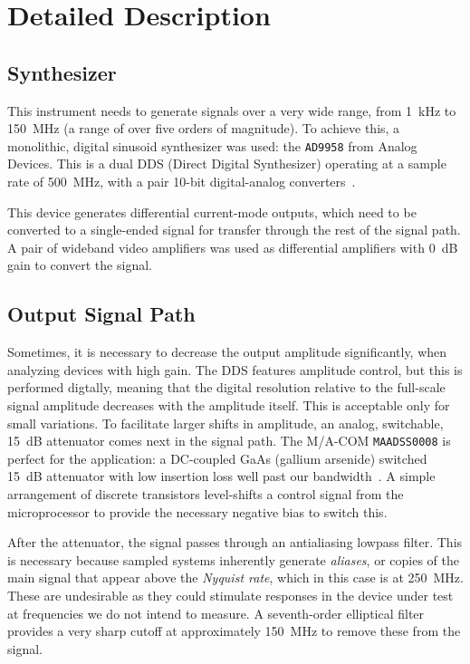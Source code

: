 \section{Detailed Description}

\subsection{Synthesizer}
This instrument needs to generate signals over a very wide range, from 1~kHz to
150~MHz (a range of over five orders of magnitude). To achieve this, a monolithic,
digital sinusoid synthesizer was used: the \texttt{AD9958} from Analog Devices.
This is a dual DDS (Direct Digital Synthesizer) operating at a sample rate of
500~MHz, with a pair 10-bit digital-analog converters~\cite{ad9958}.

This device generates differential current-mode outputs, which need to be
converted to a single-ended signal for transfer through the rest of the signal
path. A pair of wideband video amplifiers was used as differential amplifiers
with 0~dB gain to convert the signal.

\subsection{Output Signal Path}
Sometimes, it is necessary to decrease the output amplitude significantly, when
analyzing devices with high gain. The DDS features amplitude control, but this
is performed digtally, meaning that the digital resolution relative to the full-scale
signal amplitude decreases with the amplitude itself. This is acceptable only for
small variations. To facilitate larger shifts in amplitude, an analog, switchable,
15~dB attenuator comes next in the signal path. The M/A-COM \texttt{MAADSS0008} is
perfect for the application: a DC-coupled GaAs (gallium arsenide) switched 15~dB
attenuator with low insertion loss well past our bandwidth~\cite{maadss0008}. A
simple arrangement of discrete transistors level-shifts a control signal from the
microprocessor to provide the necessary negative bias to switch this.

After the attenuator, the signal passes through an antialiasing lowpass filter.
This is necessary because sampled systems inherently generate \emph{aliases},
or copies of the main signal that appear above the \emph{Nyquist rate}, which
in this case is at 250~MHz. These are undesirable as they could stimulate responses
in the device under test at frequencies we do not intend to measure. A seventh-order
elliptical filter provides a very sharp cutoff at approximately 150~MHz to remove
these from the signal.

